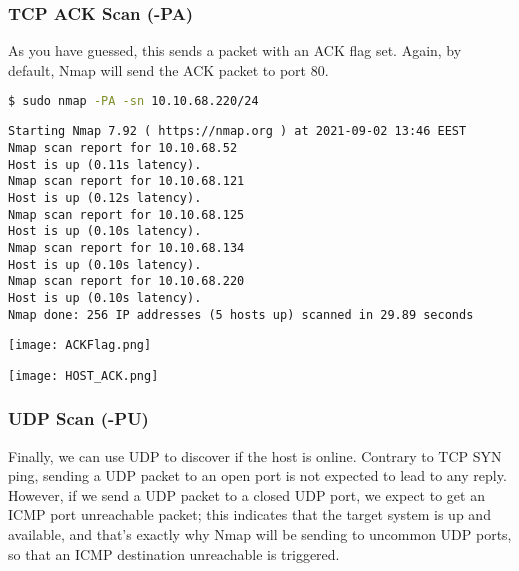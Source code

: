 \documentclass[11pt]{article}
\newenvironment{commandbox}[1][]{
  \begin{tcolorbox}[
      colback=kalibackground,
      colframe=commandcolor,
      fonttitle=\bfseries\color{white},
      title=#1,
      breakable=true
    ]
  }{
  \end{tcolorbox}
}
\begin{document}
\subsubsection{TCP ACK Scan (-PA)}

As you have guessed, this sends a packet with an ACK flag set. Again,
by default, Nmap will send the ACK packet to port 80.

\begin{commandbox}[TCP ACK Scan (-PA)]
\begin{lstlisting}[language=bash, style=bash, basicstyle=\small\ttfamily\color{warningcolor}]
$ sudo nmap -PA -sn 10.10.68.220/24
\end{lstlisting}
\begin{lstlisting}[basicstyle=\small\ttfamily\color{kalitext}]
Starting Nmap 7.92 ( https://nmap.org ) at 2021-09-02 13:46 EEST
Nmap scan report for 10.10.68.52
Host is up (0.11s latency).
Nmap scan report for 10.10.68.121
Host is up (0.12s latency).
Nmap scan report for 10.10.68.125
Host is up (0.10s latency).
Nmap scan report for 10.10.68.134
Host is up (0.10s latency).
Nmap scan report for 10.10.68.220
Host is up (0.10s latency).
Nmap done: 256 IP addresses (5 hosts up) scanned in 29.89 seconds
\end{lstlisting}
\end{commandbox}
\begin{center}
  \texttt{[image: ACKFlag.png]}
\end{center}
\begin{center}
  \texttt{[image: HOST\_ACK.png]}
\end{center}
\subsubsection{UDP Scan (-PU)}

Finally, we can use UDP to discover if the host is online. Contrary
to TCP SYN ping, sending a UDP packet to an open port is not expected
to lead to any reply. However, if we send a UDP packet to a closed
UDP port, we expect to get an ICMP port unreachable packet; this
indicates that the target system is up and available, and that's
exactly why Nmap will be sending to uncommon UDP ports, so that an
ICMP destination unreachable is triggered.
\end{document}
